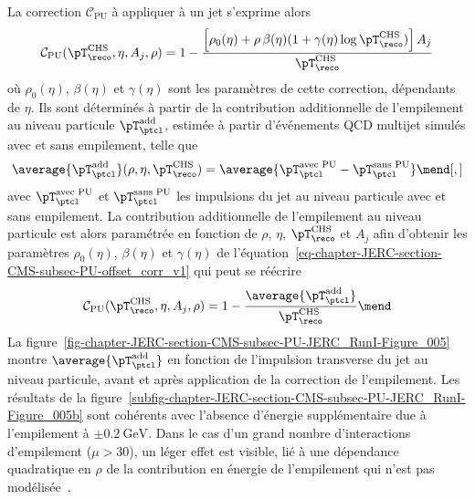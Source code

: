 La correction $\mathcal{C}_\text{PU}$ à appliquer à un jet s'exprime alors
\begin{equation}
\mathcal{C}_\text{PU}(\pT_\reco^\text{CHS}, \eta, A_j, \rho)
= 1 - \frac{\left[\rho_0(\eta) + \rho\,\beta(\eta)(1+\gamma(\eta)\log\pT_\reco^\text{CHS})\right]A_j}{\pT_\reco^\text{CHS}}
\label{eq-chapter-JERC-section-CMS-subsec-PU-offset_corr_v1}
\end{equation}
où $\rho_0(\eta)$, $\beta(\eta)$ et $\gamma(\eta)$ sont les paramètres de cette correction, dépendants de $\eta$.
Ils sont déterminés à partir de la contribution additionnelle de l'empilement au niveau particule $\pT_\ptcl^\text{add}$, estimée à partir d'événements QCD multijet simulés avec et sans empilement, telle que
\begin{equation}
\average{\pT_\ptcl^\text{add}}(\rho, \eta, \pT_\reco^\text{CHS})
=
\average{\pT_\ptcl^\text{avec PU} - \pT_\ptcl^\text{sans PU}}
\mend[,]
\label{eq-chapter-JERC-section-CMS-subsec-PU-pTaddptcl}
\end{equation}
avec
$\pT_\ptcl^\text{avec PU}$ et $\pT_\ptcl^\text{sans PU}$
les impulsions du jet au niveau particule avec et sans empilement.
La contribution additionnelle de l'empilement au niveau particule est alors paramétrée en fonction de $\rho$, $\eta$, $\pT_\reco^\text{CHS}$ et $A_j$ afin d'obtenir les paramètres $\rho_0(\eta)$, $\beta(\eta)$ et $\gamma(\eta)$ de l'équation~\eqref{eq-chapter-JERC-section-CMS-subsec-PU-offset_corr_v1} qui peut se réécrire
\begin{equation}
\mathcal{C}_\text{PU}(\pT_\reco^\text{CHS}, \eta, A_j, \rho)
= 1 - \frac{\average{\pT_\ptcl^\text{add}}}{\pT_\reco^\text{CHS}}
\mend
\label{eq-chapter-JERC-section-CMS-subsec-PU-offset_corr_v2}
\end{equation}
La figure~\ref{fig-chapter-JERC-section-CMS-subsec-PU-JERC_RunI-Figure_005} montre $\average{\pT_\ptcl^\text{add}}$ en fonction de l'impulsion transverse du jet au niveau particule, avant et après application de la correction de l'empilement.
Les résultats de la figure~\ref{subfig-chapter-JERC-section-CMS-subsec-PU-JERC_RunI-Figure_005b} sont cohérents avec l'absence d'énergie supplémentaire due à l'empilement à $\pm\SI{0.2}{\GeV}$. Dans le cas d'un grand nombre d'interactions d'empilement ($\mu>30$), un léger effet est visible, lié à une dépendance quadratique en $\rho$ de la contribution en énergie de l'empilement qui n'est pas modélisée~\cite{JERC_RunI}.
